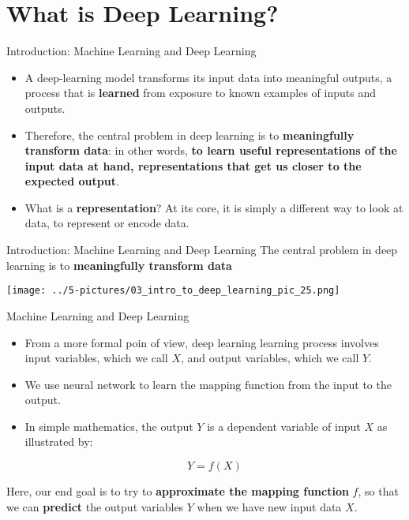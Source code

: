 \documentclass[11pt]{beamer}
\newcommand{\highlight}[1]{%
  \colorbox{yellow!100}{$\displaystyle#1$}}
\begin{document}
\section{What is Deep Learning?}
%
%
\begin{frame}{Introduction: Machine Learning and Deep Learning}
	\begin{itemize}
		\item A deep-learning model transforms its input data into meaningful outputs, a process that is \textbf{learned} from exposure to known examples of inputs and outputs. 
		\item Therefore, the central problem in deep learning is to \textbf{meaningfully transform data}: in other words, \textbf{to learn useful representations of the input data at hand, representations that get us closer to the expected output}. 
		\item What is a \textbf{representation}? At its core, it is simply a different way to look at data, to represent or encode data.
	\end{itemize}
\end{frame}
\begin{frame}{Introduction: Machine Learning and Deep Learning}
The central problem in deep learning is to \textbf{meaningfully transform data}

	\begin{center}
	\texttt{[image: ../5-pictures/03\_intro\_to\_deep\_learning\_pic\_25.png]}
	\end{center}
\end{frame}
\begin{frame}{Machine Learning and Deep Learning}
\begin{itemize}
\item From a more formal poin of view, deep learning learning process involves input variables, which we call $X$, and output variables, which we call $Y$. 

\item We use neural network \highlight{\text{to learn the mapping function}} from the input to the output. 

\item In simple mathematics, the output $Y$ is a dependent variable of input $X$ as illustrated by:

$$Y = f(X)$$
\end{itemize}

\begin{tcolorbox}
Here, our end goal is to try to \textbf{approximate the mapping function} $f$, so that we can \textbf{predict} the output variables $Y$ when we have new input data $X$.
\end{tcolorbox}
\end{frame}
\end{document}
